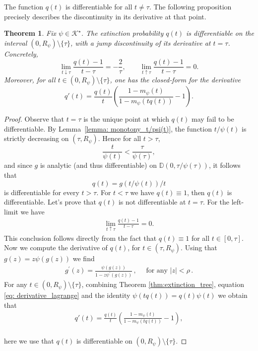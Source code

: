 \documentclass[11pt,a4paper,leqno]{amsart}
\theoremstyle{plain}
\newtheorem{theo}{Theorem}[section]
\theoremstyle{definition}
\numberwithin{equation}{section}
\begin{document}
	
	The function $q(t)$ is differentiable for all $t\neq\tau$. The following proposition precisely describes the discontinuity in its derivative at that point. 
	\begin{theo}
		Fix \(\psi\in\mathcal K^\star\). The extinction probability \(q(t)\) is differentiable on the interval \((0,R_\psi)\setminus\{\tau\}\), with a jump discontinuity of its derivative at \(t=\tau\). Concretely,
		\[
		\lim_{t\downarrow\tau}\frac{q(t)-1}{t-\tau}=-\frac{2}{\tau},
		\qquad
		\lim_{t\uparrow\tau}\frac{q(t)-1}{t-\tau}=0.
		\]
		Moreover, for all \(t\in(0,R_\psi)\setminus \{\tau\}\), one has the closed‐form for the derivative
		\[
		q'(t)
		=\frac{q(t)}{t}\left(\frac{1-m_\psi(t)}{1-m_\psi(tq(t))}-1\right).
		\]
	\end{theo}
	\begin{proof} Observe that \(t = \tau\) is the unique point at which \(q(t)\) may fail to be differentiable. By Lemma~\ref{lemma: monotony_t/psi(t)}, the function \(t/\psi(t)\) is strictly decreasing on \((\tau,R_{\psi})\). Hence for all \(t>\tau\),
		\[
		\frac{t}{\psi(t)} < \frac{\tau}{\psi(\tau)},
		\]
		and since \(g\) is analytic (and thus differentiable) on \(\mathbb{D}(0,\tau/\psi(\tau))\), it follows that 
		\[
		q(t) = {g(t/\psi(t))}/{t}
		\]
		is differentiable for every \(t>\tau\). For $t < \tau$ we have $q(t) \equiv 1$, then $q(t)$ is differentiable. Let's prove that $q(t)$ is not differentiable at $t = \tau$. For the left-limit we have
		\begin{align*}
			\lim_{t \uparrow \tau} \frac{q(t) - 1}{t - \tau} = 0.
		\end{align*}
		This conclusion follows directly from the fact that \(q(t)\equiv1\) for all \(t\in[0,\tau]\). Now we compute the derivative of $q(t)$, for $t \in (\tau,R_{\psi})$. Using that $g(z) = z\psi(g(z))$ we find  
		\begin{align}\label{eq: derivative_lagrange}
			g^{\prime}(z) = \frac{\psi(g(z))}{1-z\psi^{\prime}(g(z))}\,, \quad \text{ for any } |z|<\rho\,.
		\end{align}
		For any \(t \in (0,R_{\psi}) \setminus \{\tau\}\), combining Theorem \ref{thm:extinction_tree}, equation \eqref{eq: derivative_lagrange} and the identity \(\psi(tq(t))=q(t)\psi(t)\) we obtain that
		\begin{align}\label{eq: derivada_q}
			q'(t)=\frac{q(t)}{t}{\left(\frac{1-m_{\psi}(t)}{1-m_{\psi}(tq(t))}-1\right)},
		\end{align}\\[.001 cm]
		here we use that \(q(t)\) is differentiable on \((0,R_{\psi}) \setminus \{\tau\}\). 
		\smallskip
		

\end{proof}
\end{document}
